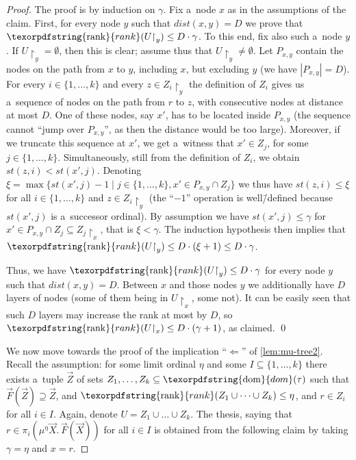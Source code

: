 \documentclass[11pt,a4paper]{amsart}
\theoremstyle{plain}
\theoremstyle{definition}
\theoremstyle{defC}
\theoremstyle{thmC}
\theoremstyle{plain}
\numberwithin{equation}{section}
\numberwithin{equation}{section}
\numberwithin{figure}{section}
\newcommand{\ident}[1]{\ensuremath{\texorpdfstring{\mathrm{\mathnm{#1}}}{#1}}\xspace}
\newcommand{\dom}{\ident{dom}}
\newcommand{\mathnm}[1]{#1}
\newcommand{\restr}{{\upharpoonright}}
\newenvironment{proofof}[1]
	{\vspace{1ex}\noindent{\emph{Proof of #1}}\hspace{0.5em}}
    {\hfill\qed\vspace{1ex}}
\newcommand{\rank}{\ident{rank}}
\newcommand{\dist}{\mathit{dist}}
\newcommand{\stab}{\mathit{st}}
\begin{document}
\begin{proof}
	\begin{proofof}{\cref{clm:2}.}
		The proof is by induction on $\gamma$.
		Fix a~node $x$ as in the assumptions of the claim.
		First, for every node $y$ such that $\dist(x,y)=D$ we prove that $\rank(U\restr_y)\leq D\cdot\gamma$.
		To this end, fix also such a~node $y$.
		If $U\restr_y=\emptyset$, then this is clear; assume thus that $U\restr_y\neq\emptyset$.
		Let $P_{x,y}$ contain the nodes on the path from $x$ to $y$, including $x$, but excluding $y$ (we have $|P_{x,y}|=D$).
		For every $i\in\{1,\dots,k\}$ and every $z\in Z_i\restr_y$ the definition of $Z_i$ gives us a~sequence of nodes on the path from $r$ to $z$, with consecutive nodes at distance at most $D$.
		One of these nodes, say $x'$, has to be located inside $P_{x,y}$ (the sequence cannot ``jump over $P_{x,y}$'', as then the distance would be too large).
		Moreover, if we truncate this sequence at $x'$, we get a~witness that $x'\in Z_j$, for some $j\in\{1,\dots,k\}$.
		Simultaneously, still from the definition of $Z_i$, we obtain $\stab(z,i)<\stab(x',j)$.
		Denoting $\xi=\max\{\stab(x',j)-1\mid j\in\{1,\dots,k\},x'\in P_{x,y}\cap Z_j\}$ we thus have $\stab(z,i)\leq\xi$ for all $i\in\{1,\dots,k\}$ and $z\in Z_i\restr_y$
		(the ``$-1$'' operation is well\=/defined because $\stab(x',j)$ is a~successor ordinal).
		By assumption we have $\stab(x',j)\leq\gamma$ for $x'\in P_{x,y}\cap Z_j\subseteq Z_j\restr_x$, that is $\xi<\gamma$.
		The induction hypothesis then implies that $\rank(U\restr_y)\leq D\cdot(\xi+1)\leq D\cdot\gamma$.

		Thus, we have $\rank(U\restr_y)\leq D\cdot\gamma$ for every node $y$ such that $\dist(x,y)=D$.
		Between $x$ and those nodes $y$ we additionally have $D$ layers of nodes (some of them being in $U\restr_x$, some not).
		It can be easily seen that such $D$ layers may increase the rank at most by $D$, so $\rank(U\restr_x)\leq D\cdot(\gamma+1)$, as claimed.
	\end{proofof}
	
	We now move towards the proof of the implication ``$\Leftarrow$'' of \cref{lem:mu-tree2}.
	Recall the assumption: for some limit ordinal $\eta$ and some $I\subseteq\{1,\dots,k\}$
	there exists a~tuple $\vec{Z}$ of sets $Z_1,\dots,Z_k\subseteq\dom(\tau)$ such that $\vec{F}(\vec{Z})\supseteq\vec{Z}$, and $\rank(Z_1\cup\dots\cup Z_k)\leq\eta$, and $r\in Z_i$ for all $i\in I$.
	Again, denote $U=Z_1\cup\dots\cup Z_k$.
	The thesis, saying that $r\in\pi_i(\mu^\eta\vec{X}.\,\vec{F}(\vec{X}))$ for all $i\in I$ is obtained from the following claim by taking $\gamma=\eta$ and $x=r$.


\end{proof}
\end{document}
